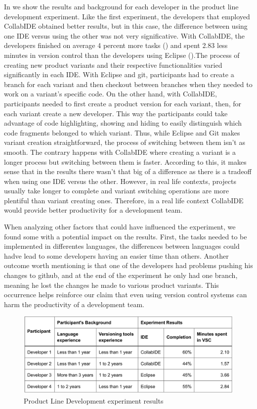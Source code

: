 In  we show the results and background for each developer in the product line development experiment. Like the first experiment, the developers that employed CollabIDE obtained better results, but in this case, the difference between using one IDE versus using the other was not very significative. With CollabIDE, the developers finished on average 4 percent more tasks () and spent 2.83 less minutes in version control than the developers using Eclipse ().The process of creating new product variants and their respective functionalities varied significantly in each IDE. With Eclipse and git, participants had to create a branch for each variant and then checkout between branches when they needed to work on a variant’s specific code. On the other hand, with CollabIDE, participants needed to first create a product version for each variant, then, for each variant create a new developer. This way the participants could take advantage of code highlighting, showing and hiding to easily distinguish which code fragments belonged to which variant. Thus, while Eclipse and Git makes variant creation straightforward, the process of switching between them isn’t as smooth. The contrary happens with CollabIDE where creating a variant is a longer process but switching between them is faster. According to this, it makes sense that in the results there wasn’t that big of a difference as there is a tradeoff when using one IDE versus the other. However, in real life contexts, projects usually take longer to complete and variant switching operations are more plentiful than variant creating ones. Therefore, in a real life context CollabIDE would provide better productivity for a development team.

When analyzing other factors that could have influenced the experiment, we found some with a potential impact on the results. First, the tasks needed to be implemented in differentes languages, the differences between languages could hadve lead to some developers having an easier time than others. Another outcome worth mentioning is that one of the developers had problems pushing his changes to github, and at the end of the experiment he only had one branch, meaning he lost the changes he made to various product variants. This occurrence helps reinforce our claim that even using version control systems can harm the productivity of a development team.   
\begin{figure}[htbp]
  \centering
  \includegraphics[width=1\textwidth]{img/resultsTableProductLine}
  \caption{Product Line Development experiment results}
  \label{fig:resultsTableProductLine}
\end{figure}

